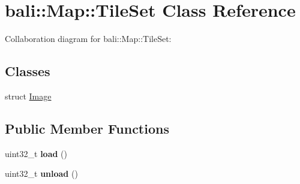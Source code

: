 \hypertarget{classbali_1_1_map_1_1_tile_set}{\section{bali\-:\-:Map\-:\-:Tile\-Set Class Reference}
\label{classbali_1_1_map_1_1_tile_set}
}


Collaboration diagram for bali\-:\-:Map\-:\-:Tile\-Set\-:
\subsection*{Classes}
\begin{DoxyCompactItemize}
\item 
struct \hyperlink{structbali_1_1_map_1_1_tile_set_1_1_image}{Image}
\end{DoxyCompactItemize}
\subsection*{Public Member Functions}
\begin{DoxyCompactItemize}
\item 
\hypertarget{classbali_1_1_map_1_1_tile_set_a904f34dd9a651a930580f5d473681776}{uint32\-\_\-t {\bfseries load} ()}\label{classbali_1_1_map_1_1_tile_set_a904f34dd9a651a930580f5d473681776}

\item 
\hypertarget{classbali_1_1_map_1_1_tile_set_a706fd99b5a61ab2fae82db707046b1fe}{uint32\-\_\-t {\bfseries unload} ()}\label{classbali_1_1_map_1_1_tile_set_a706fd99b5a61ab2fae82db707046b1fe}

\end{DoxyCompactItemize}
